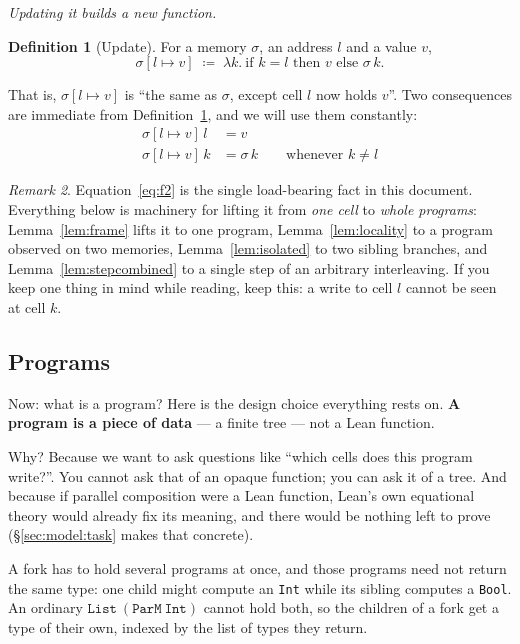 \documentclass[11pt,a4paper]{article}
\theoremstyle{definition}
\newtheorem{definition}{Definition}
\theoremstyle{plain}
\theoremstyle{remark}
\newtheorem{remark}[definition]{Remark}
\newcommand{\PM}{\texttt{ParM}}
\newcommand{\st}{\sigma}
\newcommand{\upd}[3]{#1[#2 \mapsto #3]}
\begin{document}
\emph{Updating it builds a new function.}

\begin{definition}[Update]\label{def:update}
For a memory $\st$, an address $l$ and a value $v$,
\[
  \upd{\st}{l}{v} \;\coloneqq\; \lambda k.\ \text{if } k = l \text{ then } v \text{ else } \st\,k .
\]
\end{definition}

That is, $\upd{\st}{l}{v}$ is ``the same as $\st$, except cell $l$ now holds $v$''. Two
consequences are immediate from Definition~\ref{def:update}, and we will use them
constantly:
\begin{align}
  \upd{\st}{l}{v}\,l &= v \label{eq:f1}\\
  \upd{\st}{l}{v}\,k &= \st\,k \qquad\text{whenever } k \neq l \label{eq:f2}
\end{align}

\begin{remark}\label{rem:f2}
Equation~\eqref{eq:f2} is the single load-bearing fact in this document. Everything below
is machinery for lifting it from \emph{one cell} to \emph{whole programs}: Lemma~\ref{lem:frame}
lifts it to one program, Lemma~\ref{lem:locality} to a program observed on two memories,
Lemma~\ref{lem:isolated} to two sibling branches, and Lemma~\ref{lem:stepcombined} to a
single step of an arbitrary interleaving. If you keep one thing in mind while reading, keep
this: a write to cell $l$ cannot be seen at cell $k$.
\end{remark}

\subsection{Programs}\label{sec:model:parm}

Now: what is a program? Here is the design choice everything rests on. \textbf{A program is
a piece of data} --- a finite tree --- not a Lean function.

Why? Because we want to ask questions like ``which cells does this program write?''. You
cannot ask that of an opaque function; you can ask it of a tree. And because if parallel
composition were a Lean function, Lean's own equational theory would already fix its
meaning, and there would be nothing left to prove (\S\ref{sec:model:task} makes that
concrete).

A fork has to hold several programs at once, and those programs need not return the same
type: one child might compute an \texttt{Int} while its sibling computes a \texttt{Bool}.
An ordinary $\texttt{List}\ (\PM\ \texttt{Int})$ cannot hold both, so the children of a fork
get a type of their own, indexed by the list of types they return.
\end{document}
